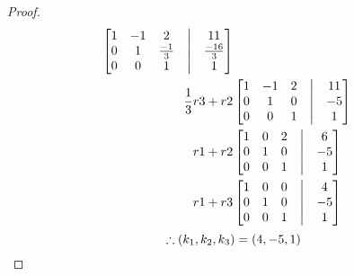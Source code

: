 \documentclass[12pt]{article}
\begin{document}
\begin{enumerate}
\begin{enumerate}
\begin{proof}
\begin{align*}
                                            \begin{bmatrix}
                                                    1 & -1 & 2            & \bigm| & 11            \\
                                                    0 & 1  & \frac{-1}{3} & \bigm| & \frac{-16}{3} \\
                                                    0 & 0  & 1            & \bigm| & 1             \\
                                            \end{bmatrix} \\
                                            \frac{1}{3}r3+r2
                                             &
                                            \begin{bmatrix}
                                                    1 & -1 & 2 & \bigm| & 11 \\
                                                    0 & 1  & 0 & \bigm| & -5 \\
                                                    0 & 0  & 1 & \bigm| & 1  \\
                                            \end{bmatrix} \\
                                            r1 + r2
                                             &
                                            \begin{bmatrix}
                                                    1 & 0 & 2 & \bigm| & 6  \\
                                                    0 & 1 & 0 & \bigm| & -5 \\
                                                    0 & 0 & 1 & \bigm| & 1  \\
                                            \end{bmatrix} \\
                                            r1 + r3
                                             &
                                            \begin{bmatrix}
                                                    1 & 0 & 0 & \bigm| & 4  \\
                                                    0 & 1 & 0 & \bigm| & -5 \\
                                                    0 & 0 & 1 & \bigm| & 1  \\
                                            \end{bmatrix}
                                    \end{align*}
                                    \begin{equation*}
                                            \therefore (k_{1}, k_{2}, k_{3}) = (4, -5, 1) \\
                                    \end{equation*}
                            \end{proof}
                            \pagebreak

\end{enumerate}
\end{enumerate}
\end{document}
